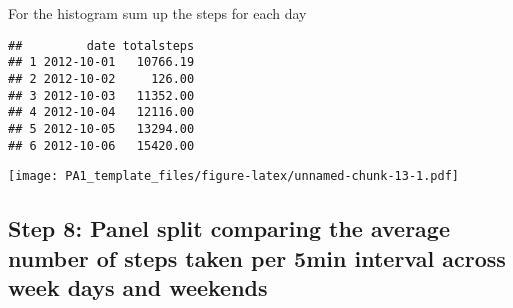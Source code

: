 \documentclass[]{article}
\newenvironment{Shaded}{\begin{snugshade}}{\end{snugshade}}
\newcommand{\DataTypeTok}[1]{\textcolor[rgb]{0.13,0.29,0.53}{#1}}
\newcommand{\DecValTok}[1]{\textcolor[rgb]{0.00,0.00,0.81}{#1}}
\newcommand{\KeywordTok}[1]{\textcolor[rgb]{0.13,0.29,0.53}{\textbf{#1}}}
\newcommand{\NormalTok}[1]{#1}
\newcommand{\OperatorTok}[1]{\textcolor[rgb]{0.81,0.36,0.00}{\textbf{#1}}}
\newcommand{\StringTok}[1]{\textcolor[rgb]{0.31,0.60,0.02}{#1}}
\begin{document}
For the histogram sum up the steps for each day

\begin{Shaded}
\end{Shaded}

\begin{verbatim}
##         date totalsteps
## 1 2012-10-01   10766.19
## 2 2012-10-02     126.00
## 3 2012-10-03   11352.00
## 4 2012-10-04   12116.00
## 5 2012-10-05   13294.00
## 6 2012-10-06   15420.00
\end{verbatim}

\begin{Shaded}
\end{Shaded}

\texttt{[image: PA1\_template\_files/figure-latex/unnamed-chunk-13-1.pdf]}

\hypertarget{step-8-panel-split-comparing-the-average-number-of-steps-taken-per-5min-interval-across-week-days-and-weekends}{%
\subsection{Step 8: Panel split comparing the average number of steps
taken per 5min interval across week days and
weekends}\label{step-8-panel-split-comparing-the-average-number-of-steps-taken-per-5min-interval-across-week-days-and-weekends}}

\begin{Shaded}
\end{Shaded}
\end{document}
